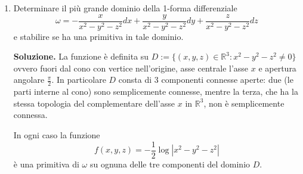 \begin{enumerate}
		Dall'irrotazionalità di $F$, essendo $\mathbb{R}^3 \setminus \{(0,0,0)\}$ semplicemente connesso, esiste un potenziale $V: \mathbb{R}^3 \setminus \{(0,0,0)\} \to \mathbb{R}$ di $F$. Sappiamo quindi che
		\[
		\frac{\partial V}{\partial y} = -\frac{2xy}{(x^2 + y^2 + z^2)^2}.
		\]
		In questo caso non è possibile utilizzare la curva $\gamma(t) = t(x,y,z)$ come nell'esercizio precedente. Integrando rispetto ad $y$ abbiamo
		\[
		\begin{aligned}
			V(x,y,z) &= V(x,0,z) + \int_0^y \frac{\partial V}{\partial y}(x,t,z) dt \\
			&= \varphi(x,z) - \int_0^y \frac{2xt}{(x^2 + t^2 + z^2)^2} dt \\
			&= \varphi(x,z) + x \int_0^y \left((x^2 + t^2 + z^2)^{-1}\right)' dt \\
			&= \varphi(x,z) + \frac{x}{x^2 + y^2 + z^2} - \frac{x}{x^2 + z^2}.
		\end{aligned}
		\]
		Osserviamo che
		\[
		\frac{\partial V}{\partial x} = \frac{\partial}{\partial x} \left(\varphi - \frac{x}{x^2 + z^2}\right) + \frac{y^2 + z^2 - x^2}{(x^2 + y^2 + z^2)^2} = \frac{y^2 + z^2 - x^2}{(x^2 + y^2 + z^2)^2}
		\]
		e inoltre
		\[
		\frac{\partial V}{\partial z} = \frac{\partial}{\partial z} \left(\varphi - \frac{x}{x^2 + z^2}\right) - \frac{2xz}{(x^2 + y^2 + z^2)^2} = -\frac{2xz}{(x^2 + y^2 + z^2)^2}.
		\]
		Concludiamo che
		\[
		\nabla \left(\varphi - \frac{x}{x^2 + z^2}\right) = (0,0)
		\]
		in $\mathbb{R}^2 \setminus \{(0,0)\}$, che essendo connesso per archi implica che
		\[
		\varphi - \frac{x}{x^2 + z^2} = c \in \mathbb{R},
		\]
		e quindi concludiamo che
		\[
		V(x,y,z) = \frac{x}{x^2 + y^2 + z^2} + c.
		\]
	
	
	\item Determinare il più grande dominio della 1-forma differenziale
	\[
	\omega = -\frac{x}{x^2 - y^2 - z^2} dx + \frac{y}{x^2 - y^2 - z^2} dy + \frac{z}{x^2 - y^2 - z^2} dz
	\]
	e stabilire se ha una primitiva in tale dominio.
	
	\textbf{Soluzione.}
		La funzione è definita su $D := \{(x,y,z) \in \mathbb{R}^3 : x^2 - y^2 - z^2 \neq 0\}$ ovvero fuori dal cono con vertice nell'origine, asse centrale l'asse $x$ e apertura angolare $\frac{\pi}{2}$. In particolare $D$ consta di 3 componenti connesse aperte: due (le parti interne al cono) sono semplicemente connesse, mentre la terza, che ha la stessa topologia del complementare dell'asse $x$ in $\mathbb{R}^3$, non è semplicemente connessa.
		
		In ogni caso la funzione
		\[
		f(x,y,z) = -\frac{1}{2} \log \left|x^2 - y^2 - z^2\right|
		\]
		è una primitiva di $\omega$ su ognuna delle tre componenti del dominio $D$.
	

\end{enumerate}
